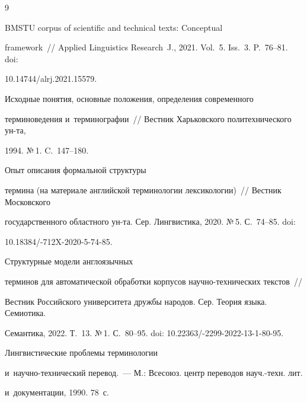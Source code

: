 {\small\frenchspacing


{%




\begin{thebibliography}{9}




 BMSTU corpus of scientific and technical texts: Conceptual 


framework~/\!\!/ Applied Linguistics Research~J., 2021. Vol.~5. Iss.~3. P.~76--81. doi: 


10.14744\!/\!\mbox{alrj}.2021.15579.




 Исходные понятия, основные положения, определения современного 


терминоведения и~терминографии~/\!\!/ Вестник Харьковского политехнического ун-та, 


1994. №\,1. C.~147--180. 




 Опыт описания формальной структуры 


термина (на материале английской терминологии лексикологии)~/\!\!/ Вестник Московского 


государственного областного ун-та. Сер. Лингвистика, 2020. №\,5. С.~74--85. doi: 


10.18384\!/-712X-2020-5-74-85.




 Структурные модели англоязычных 


терминов для автоматической обработки корпусов на\-уч\-но-тех\-ни\-че\-ских текс\-тов~/\!\!/ 


Вестник Российского университета дружбы народов. Сер. Теория языка. Семиотика. 


Семантика, 2022. Т.~13. №\,1. С.~80--95. doi: 10.22363\!/-2299-2022-13-1-80-95.




 Лингвистические проблемы терминологии  


и~на\-уч\-но-тех\-ни\-че\-ский перевод.~--- М.: Всесоюз. центр переводов науч.-техн. лит. 


и~документации, 1990. 78~с.





\end{thebibliography}}}
